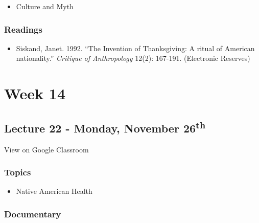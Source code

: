 \documentclass[]{book}
\providecommand{\tightlist}{%
  \setlength{\itemsep}{0pt}\setlength{\parskip}{0pt}}
\theoremstyle{definition}
\theoremstyle{definition}
\theoremstyle{definition}
\theoremstyle{remark}
\begin{document}
\begin{itemize}
\tightlist
\item
  Culture and Myth
\end{itemize}

\hypertarget{readings-23}{%
\subsubsection*{Readings}\label{readings-23}}

\begin{itemize}
\tightlist
\item
  Siskand, Janet. 1992. ``The Invention of Thanksgiving: A ritual of
  American nationality.'' \emph{Critique of Anthropology} 12(2):
  167-191. (Electronic Reserves)
\end{itemize}

\hypertarget{week-14}{%
\section*{Week 14}\label{week-14}}

\hypertarget{lecture-22---monday-november-26th}{%
\subsection*{\texorpdfstring{Lecture 22 - Monday, November
26\textsuperscript{th}}{Lecture 22 - Monday, November 26th}}\label{lecture-22---monday-november-26th}}

View on Google Classroom

\hypertarget{topics-26}{%
\subsubsection*{Topics}\label{topics-26}}

\begin{itemize}
\tightlist
\item
  Native American Health
\end{itemize}

\hypertarget{documentary-3}{%
\subsubsection*{Documentary}\label{documentary-3}}
\end{document}

